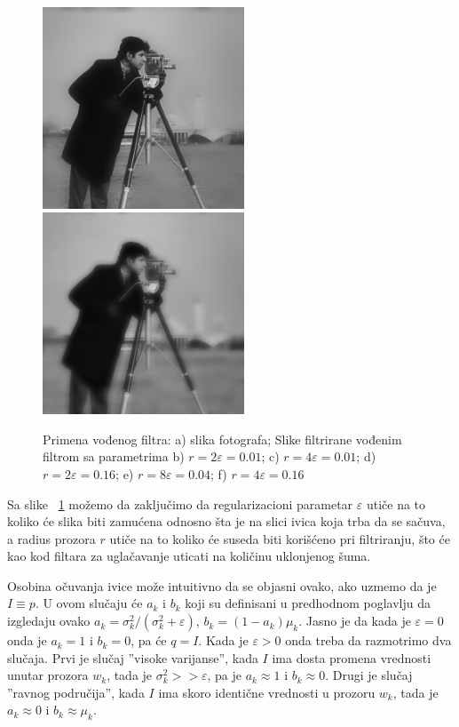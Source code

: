 \documentclass[a4paper,12pt,titlepage]{article}
\begin{document}
\begin{figure}[ht!]
\includegraphics[width=60mm]{img/imgGF8_04.png}
\includegraphics[width=60mm]{img/imgGF4_16.png}
\caption{Primena vođenog filtra: a) slika fotografa; Slike filtrirane vođenim filtrom sa parametrima b) $r = 2 \varepsilon = 0.01$; c) $r = 4 \varepsilon = 0.01$; d) $r = 2 \varepsilon = 0.16$; e) $r = 8 \varepsilon = 0.04$; f) $r = 4 \varepsilon = 0.16$}
\label{gfilter}
\end{figure}

Sa slike ~\ref{gfilter} možemo da zaključimo da regularizacioni parametar $\varepsilon$ utiče na to koliko će slika biti zamućena odnosno šta je na slici ivica koja trba da se sačuva, a radius prozora $r$ utiče na to koliko će suseda biti korišćeno pri filtriranju, što će kao kod filtara za uglačavanje uticati na količinu uklonjenog šuma. 

Osobina očuvanja ivice može intuitivno da se objasni ovako, ako uzmemo da je $I \equiv p$. U ovom slučaju će $a_k$ i $b_k$ koji su definisani u predhodnom poglavlju da izgledaju ovako $a_k = \sigma_k^2 / (\sigma_k^2 + \varepsilon)$, $b_k = (1 - a_k)\mu_k$. Jasno je da kada je $\varepsilon = 0$ onda je $a_k = 1$ i $b_k = 0$, pa će $q = I$. Kada je $\varepsilon > 0$ onda treba da razmotrimo dva slučaja. Prvi je slučaj ''visoke varijanse'', kada $I$ ima dosta promena vrednosti unutar prozora $w_k$, tada je $\sigma_k^2 >> \varepsilon$, pa je $a_k \approx 1$ i $b_k \approx 0$. Drugi je slučaj ''ravnog područija'', kada $I$ ima skoro identične vrednosti u prozoru $w_k$, tada je $a_k \approx 0$ i $b_k \approx \mu_k$. 
\end{document}

